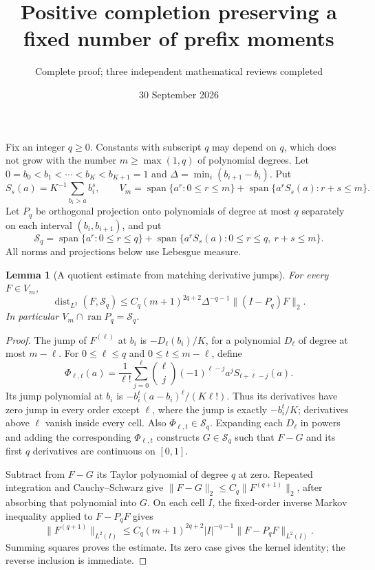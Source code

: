 \documentclass[11pt]{article}
\title{Positive completion preserving a fixed number of prefix moments}
\author{Complete proof; three independent mathematical reviews completed}
\date{30 September 2026}
\newtheorem{lemma}{Lemma}
\begin{document}
\maketitle
Fix an integer $q\ge0$. Constants with subscript $q$ may depend on $q$,
which does not grow with the number $m\ge\max(1,q)$ of polynomial degrees.
Let $0=b_0<b_1<\cdots<b_K<b_{K+1}=1$ and
$\Delta=\min_i(b_{i+1}-b_i)$. Put
\[
 S_s(a)=K^{-1}\sum_{b_i>a}b_i^s,\qquad
 V_m=\operatorname{span}\{a^r:0\le r\le m\}
 +\operatorname{span}\{a^rS_s(a):r+s\le m\}.
\]
Let $P_q$ be orthogonal projection onto polynomials of degree at most $q$
separately on each interval $(b_i,b_{i+1})$, and put
\[
 \mathcal S_q=\operatorname{span}\{a^r:0\le r\le q\}
 +\operatorname{span}\{a^rS_s(a):0\le r\le q,\ r+s\le m\}.
\]
All norms and projections below use Lebesgue measure.

\begin{lemma}[A quotient estimate from matching derivative jumps]\label{quotient}
For every $F\in V_m$,
\[
 \operatorname{dist}_{L^2}(F,\mathcal S_q)
 \le C_q(m+1)^{2q+2}\Delta^{-q-1}\|(I-P_q)F\|_2.
\]
In particular $V_m\cap\operatorname{ran}P_q=\mathcal S_q$.
\end{lemma}
\begin{proof}
The jump of $F^{(\ell)}$ at $b_i$ is $-D_\ell(b_i)/K$, for a
polynomial $D_\ell$ of degree at most $m-\ell$.
For $0\le\ell\le q$ and $0\le t\le m-\ell$, define
\[
 \Phi_{\ell,t}(a)=\frac1{\ell!}
 \sum_{j=0}^{\ell}\binom\ell j(-1)^{\ell-j}
                      a^jS_{t+\ell-j}(a).
\]
Its jump polynomial at $b_i$ is
$-b_i^t(a-b_i)^\ell/(K\ell!)$.
Thus its derivatives have zero jump in every order except $\ell$,
where the jump is exactly $-b_i^t/K$; derivatives above $\ell$ vanish
inside every cell. Also $\Phi_{\ell,t}\in\mathcal S_q$.
Expanding each $D_\ell$ in powers and adding the corresponding
$\Phi_{\ell,t}$ constructs $G\in\mathcal S_q$ such that $F-G$ and its
first $q$ derivatives are continuous on $[0,1]$.

Subtract from $F-G$ its Taylor polynomial of degree $q$ at zero.
Repeated integration and Cauchy--Schwarz give
$\|F-G\|_2\le C_q\|F^{(q+1)}\|_2$, after absorbing that polynomial
into $G$. On each cell $I$, the fixed-order inverse Markov inequality
applied to $F-P_qF$ gives
\[
 \|F^{(q+1)}\|_{L^2(I)}
 \le C_q(m+1)^{2q+2}|I|^{-q-1}\|F-P_qF\|_{L^2(I)}.
\]
Summing squares proves the estimate. Its zero case gives the kernel
identity; the reverse inclusion is immediate.
\end{proof}
\end{document}
